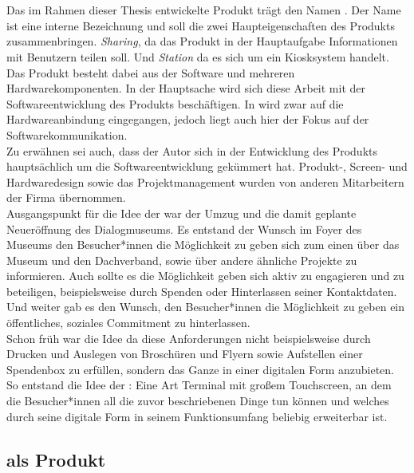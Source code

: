 \section{\shst{}}
\label{section:sharing-station}

Das im Rahmen dieser Thesis entwickelte Produkt trägt den Namen \shst{}. Der Name 
ist eine interne Bezeichnung und soll die zwei Haupteigenschaften des Produkts zusammenbringen.
\emph{Sharing}, da das Produkt in der Hauptaufgabe Informationen mit Benutzern teilen soll. 
Und \emph{Station} da es sich um ein Kiosksystem handelt.\\

Das Produkt besteht dabei aus der Software und mehreren Hardwarekomponenten. In der Hauptsache
wird sich diese Arbeit mit der Softwareentwicklung des Produkts beschäftigen. In  wird zwar
auf die Hardwareanbindung eingegangen, jedoch liegt auch hier der Fokus auf der Softwarekommunikation.\\
Zu erwähnen sei auch, dass der Autor sich in der Entwicklung des Produkts hauptsächlich um die Softwareentwicklung 
gekümmert hat. Produkt-, Screen- und Hardwaredesign sowie das Projektmanagement wurden von anderen Mitarbeitern
der Firma \meso{} übernommen.\\

Ausgangspunkt für die Idee der \shst{} war der Umzug und die damit geplante Neueröffnung des Dialogmuseums.
Es entstand der Wunsch im Foyer des Museums den Besucher*innen die Möglichkeit zu geben sich zum einen 
über das Museum und den Dachverband, sowie über andere ähnliche Projekte zu informieren. Auch sollte
es die Möglichkeit geben sich aktiv zu engagieren und zu beteiligen, beispielsweise durch Spenden oder 
Hinterlassen seiner Kontaktdaten. Und weiter gab es den Wunsch, den Besucher*innen die Möglichkeit zu geben ein 
öffentliches, soziales Commitment zu hinterlassen.\\
Schon früh war die Idee da diese Anforderungen nicht beispielsweise durch Drucken und Auslegen von 
Broschüren und Flyern sowie Aufstellen einer Spendenbox zu erfüllen, sondern das Ganze in einer digitalen
Form anzubieten. So entstand die Idee der \shst{}: Eine Art Terminal mit großem Touchscreen, an dem die Besucher*innen 
all die zuvor beschriebenen Dinge tun können und welches durch seine digitale Form in seinem Funktionsumfang
beliebig erweiterbar ist.

\subsection{\shst{} als Produkt}
\label{subsection:sharing-station-produkt}

